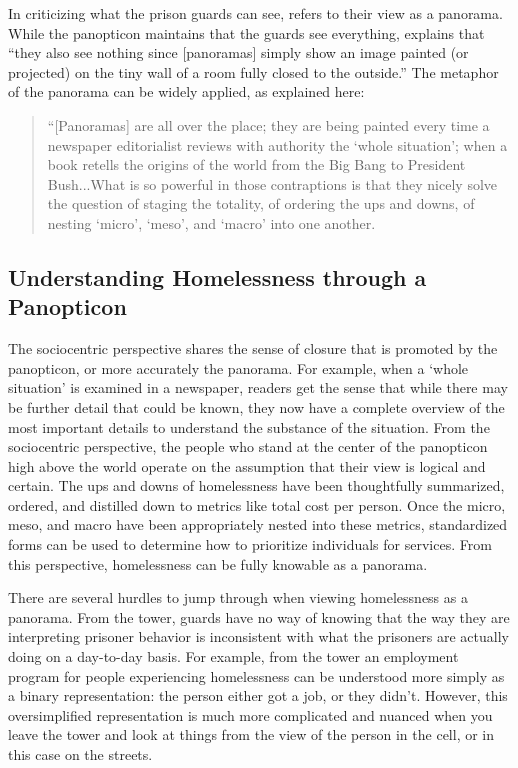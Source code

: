 In criticizing what the prison guards can see, \citet{Latour2005ANT} refers to their view as a panorama. While the panopticon maintains that the guards see everything, \citet{Latour2005ANT} explains that ``they also see nothing since [panoramas] simply show an image painted (or projected) on the tiny wall of a room fully closed to the outside.'' The metaphor of the panorama can be widely applied, as explained here:

\begin{quote}\singlespacing ``[Panoramas] are all over the place; they are being painted every time a newspaper editorialist reviews with authority the ‘whole situation’; when a book retells the origins of the world from the Big Bang to President Bush...What is so powerful in those contraptions is that they nicely solve the question of staging the totality, of ordering the ups and downs, of nesting ‘micro’, ‘meso’, and ‘macro’ into one another. \citep{Latour2005ANT} \end{quote}

\subsection{Understanding Homelessness through a Panopticon}
The sociocentric perspective shares the sense of closure that is promoted by the panopticon, or more accurately the panorama. For example, when a `whole situation' is examined in a newspaper, readers get the sense that while there may be further detail that could be known, they now have a complete overview of the most important details to understand the substance of the situation. From the sociocentric perspective, the people who stand at the center of the panopticon high above the world operate on the assumption that their view is logical and certain. The ups and downs of homelessness have been thoughtfully summarized, ordered, and distilled down to metrics like total cost per person. Once the micro, meso, and macro have been appropriately nested into these metrics, standardized forms can be used to determine how to prioritize individuals for services. From this perspective, homelessness can be fully knowable as a panorama.

There are several hurdles to jump through when viewing homelessness as a panorama. From the tower, guards have no way of knowing that the way they are interpreting prisoner behavior is inconsistent with what the prisoners are actually doing on a day-to-day basis. For example, from the tower an employment program for people experiencing homelessness can be understood more simply as a binary representation: the person either got a job, or they didn't. However, this oversimplified representation is much more complicated and nuanced when you leave the tower and look at things from the view of the person in the cell, or in this case on the streets.

